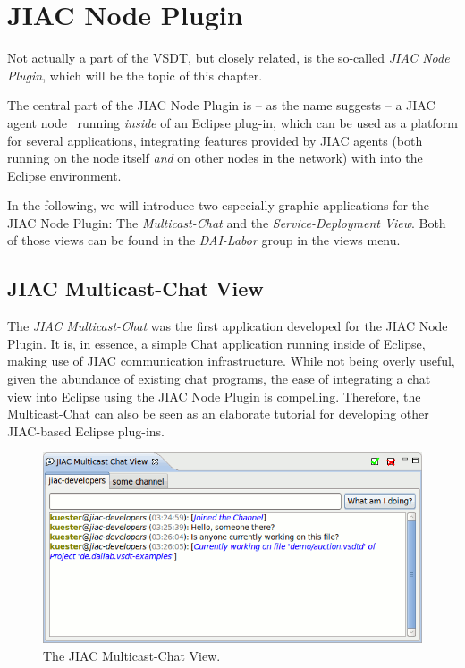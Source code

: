 \chapter{JIAC Node Plugin}
\label{sec:user_jiac-node}

Not actually a part of the VSDT, but closely related, is the so-called \emph{JIAC
Node Plugin}, which will be the topic of this chapter.

The central part of the JIAC Node Plugin is -- as the name suggests -- a JIAC
agent node~\cite{lutzenberger2013jiacShort} running \emph{inside} of an Eclipse
plug-in, which can be used as a platform for several applications, integrating
features provided by JIAC agents (both running on the node itself \emph{and} on
other nodes in the network) with into the Eclipse environment.

In the following, we will introduce two especially graphic applications for the
JIAC Node Plugin: The \emph{Multicast-Chat} and the \emph{Service-Deployment
View}.  Both of those views can be found in the \emph{DAI-Labor} group in the
views menu.



\section{JIAC Multicast-Chat View}

The \emph{JIAC Multicast-Chat} was the first application developed for the JIAC
Node Plugin.  It is, in essence, a simple Chat application running inside of
Eclipse, making use of JIAC communication infrastructure.  While not being overly
useful, given the abundance of existing chat programs, the ease of integrating a
chat view into Eclipse using the JIAC Node Plugin is compelling.  Therefore, the
Multicast-Chat can also be seen as an elaborate tutorial for developing other
JIAC-based Eclipse plug-ins.

\begin{figure}[ht]
	\centering
	\includegraphics[width=.5\textwidth]{figures/features/multicast-chat.png}
	\caption{The JIAC Multicast-Chat View.}
	\label{fig:chatView}
\end{figure}

